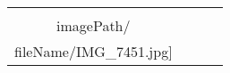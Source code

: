 \begin{table}
\begin{tabular}{cccc}
\texttt{[image: \\imagePath/\\fileName/IMG\_7451.jpg]} \\
\end{tabular}
\end{table}
